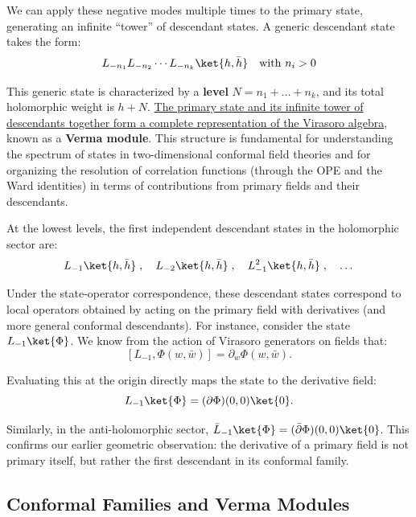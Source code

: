 We can apply these negative modes multiple times to the primary state, generating an infinite ``tower'' of descendant states. A generic descendant state takes the form:
\[
    L_{-n_1} L_{-n_2} \cdots L_{-n_k} \ket{h, \bar{h}} \quad \text{with } n_i > 0
\]

This generic state is characterized by a \textbf{level} \(N = n_1 + \dots + n_k\), and its total holomorphic weight is \(h + N\). \uline{The primary state and its infinite tower of descendants together form a complete representation of the Virasoro algebra}, known as a \textbf{Verma module}. This structure is fundamental for understanding the spectrum of states in two-dimensional conformal field theories and for organizing the resolution of correlation functions (through the OPE and the Ward identities) in terms of contributions from primary fields and their descendants.

\begin{example}
    At the lowest levels, the first independent descendant states in the holomorphic sector are:
    \[
        L_{-1}\ket{h, \bar{h}} \;, \quad L_{-2}\ket{h, \bar{h}} \;, \quad L_{-1}^2\ket{h, \bar{h}} \;, \quad \dots
    \]

    Under the state-operator correspondence, these descendant states correspond to local operators obtained by acting on the primary field with derivatives (and more general conformal descendants). For instance, consider the state \(L_{-1}\ket{\Phi}\). We know from the action of Virasoro generators on fields that:
    \[
        [L_{-1}, \Phi(w, \bar{w})] = \partial_w \Phi(w, \bar{w}).
    \]

    Evaluating this at the origin directly maps the state to the derivative field:
    \[
        L_{-1}\ket{\Phi} = (\partial\Phi)(0,0)\ket{0}.
    \]

    Similarly, in the anti-holomorphic sector, \(\bar{L}_{-1}\ket{\Phi} = (\bar{\partial}\Phi)(0,0)\ket{0}\). This confirms our earlier geometric observation: the derivative of a primary field is not primary itself, but rather the first descendant in its conformal family.
\end{example}

\subsection{Conformal Families and Verma Modules}

